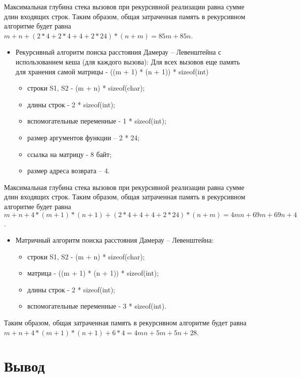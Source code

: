 Максимальная глубина стека вызовов при рекурсивной реализации равна сумме длин входящих строк. Таким образом, общая затраченная память в рекурсивном алгоритме будет равна $m + n + (2 * 4 + 2 * 4 + 4 + 2 * 24) * (n + m) = 85m + 85n$.

\begin{itemize}	
	\item Рекурсивный алгоритм поиска расстояния Дамерау -- Левенштейна с использованием кеша (для каждого вызова): Для всех вызовов еще память для хранения самой матрицы -  ((m + 1) * (n + 1)) * sizeof(int) \begin{itemize}
		\item строки S1, S2 - (m + n) * sizeof(char);
		\item длины строк - 2 * sizeof(int);
		\item вспомогательные переменные -  1 * sizeof(int);
		\item размер аргументов функции -- 2 * 24;
		\item ссылка на матрицу - 8 байт;
		\item размер адреса возврата -- 4.
\end{itemize}
\end{itemize}
	
Максимальная глубина стека вызовов при рекурсивной реализации равна сумме длин входящих строк. Таким образом, общая затраченная память в рекурсивном алгоритме будет равна $m + n + 4 * (m + 1) * (n + 1) + (2 * 4 + 4 + 4 + 2 * 24) * (n + m) = 4mn + 69m + 69n + 4$.
	\begin{itemize}
	\item Матричный алгоритм поиска расстояния Дамерау -- Левенштейна: \begin{itemize}
		\item строки S1, S2 - (m + n) * sizeof(char);
		\item матрица - ((m + 1) * (n + 1)) * sizeof(int);
		\item длины строк - 2 * sizeof(int);
		\item вспомогательные переменные -  3 * sizeof(int).
	\end{itemize}
\end{itemize}

Таким образом, общая затраченная память в рекурсивном алгоритме будет равна $m + n + 4 * (m + 1) * (n + 1) + 6 * 4 = 4mn + 5m + 5n + 28$.

\section*{Вывод}


